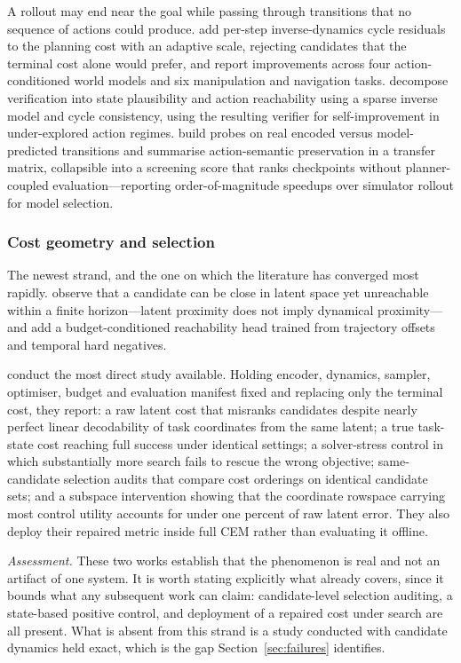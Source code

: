 \documentclass[11pt,letterpaper]{article}
\begin{document}
A rollout may end near the goal while passing through transitions that no
sequence of actions could produce. \citet{acid2026} add per-step inverse-dynamics
cycle residuals to the planning cost with an adaptive scale, rejecting
candidates that the terminal cost alone would prefer, and report improvements
across four action-conditioned world models and six manipulation and navigation
tasks. \citet{liu2026wav} decompose verification into state plausibility and
action reachability using a sparse inverse model and cycle consistency, using
the resulting verifier for self-improvement in under-explored action regimes.
\citet{chen2026atm} build probes on real encoded versus model-predicted
transitions and summarise action-semantic preservation in a transfer matrix,
collapsible into a screening score that ranks checkpoints without planner-coupled
evaluation---reporting order-of-magnitude speedups over simulator rollout for
model selection.

\subsubsection{Cost geometry and selection}\label{sec:lit-diag-cost}

The newest strand, and the one on which the literature has converged most
rapidly. \citet{rcaux2026} observe that a candidate can be close in latent space
yet unreachable within a finite horizon---latent proximity does not imply
dynamical proximity---and add a budget-conditioned reachability head trained from
trajectory offsets and temporal hard negatives.

\citet{trm2026} conduct the most direct study available. Holding encoder,
dynamics, sampler, optimiser, budget and evaluation manifest fixed and replacing
only the terminal cost, they report: a raw latent cost that misranks candidates
despite nearly perfect linear decodability of task coordinates from the same
latent; a true task-state cost reaching full success under identical settings; a
solver-stress control in which substantially more search fails to rescue the
wrong objective; same-candidate selection audits that compare cost orderings on
identical candidate sets; and a subspace intervention showing that the
coordinate rowspace carrying most control utility accounts for under one percent
of raw latent error. They also deploy their repaired metric inside full CEM
rather than evaluating it offline.

\emph{Assessment.} These two works establish that the phenomenon is real and not
an artifact of one system. It is worth stating explicitly what
\citet{trm2026} already covers, since it bounds what any subsequent work can
claim: candidate-level selection auditing, a state-based positive control, and
deployment of a repaired cost under search are all present. What is absent from
this strand is a study conducted with candidate dynamics held exact, which is
the gap Section~\ref{sec:failures} identifies.
\end{document}
